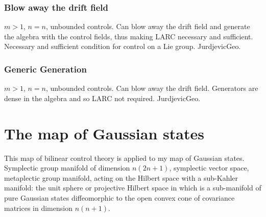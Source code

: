 \subsubsection{Blow away the drift field}
$m>1$, $n=n$, unbounded controls. Can blow away the drift field and generate the algebra with the control fields, thus making LARC necessary and sufficient. Necessary and sufficient condition for control on a Lie group. JurdjevicGeo.
\subsubsection{Generic Generation}
$m>1$, $n=n$, unbounded controls. Can blow away the drift field. Generators are dense in the algebra and so LARC not required. JurdjevicGeo.

\section{The map of Gaussian states}
This map of bilinear control theory is applied to my map of Gaussian states. Symplectic group manifold of dimension $n(2n+1)$, symplectic vector space, metaplectic group manifold, acting on the Hilbert space with a sub-Kahler manifold: the unit sphere or projective Hilbert space in which is a sub-manifold of pure Gaussian states diffeomorphic to the open convex cone of covariance matrices in dimension $n(n+1)$.

